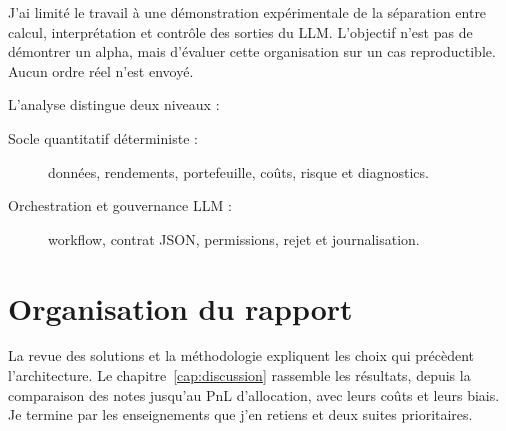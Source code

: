 J'ai limité le travail à une démonstration expérimentale de la séparation entre calcul, interprétation et contrôle des sorties du LLM. L'objectif n'est pas de démontrer un alpha, mais d'évaluer cette organisation sur un cas reproductible. Aucun ordre réel n'est envoyé.

L'analyse distingue deux niveaux :
\begin{description}
    \item[Socle quantitatif déterministe :] données, rendements, portefeuille, coûts, risque et diagnostics.
    \item[Orchestration et gouvernance LLM :] workflow, contrat JSON, permissions, rejet et journalisation.
\end{description}

\section{Organisation du rapport}

La revue des solutions et la méthodologie expliquent les choix qui précèdent l'architecture. Le chapitre~\ref{cap:discussion} rassemble les résultats, depuis la comparaison des notes jusqu'au PnL d'allocation, avec leurs coûts et leurs biais. Je termine par les enseignements que j'en retiens et deux suites prioritaires.
